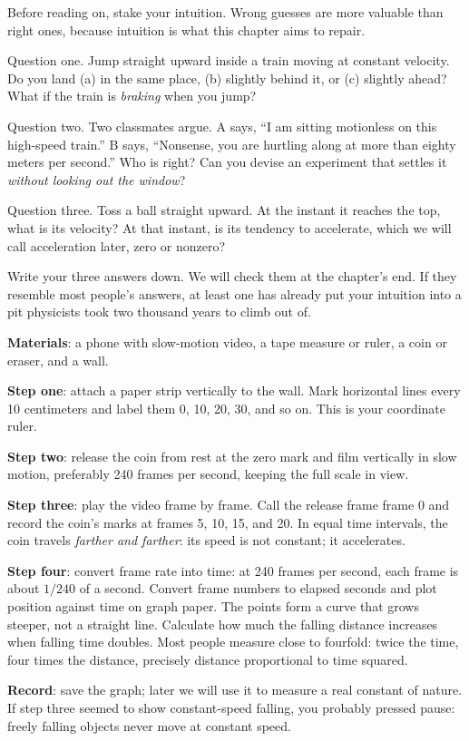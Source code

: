 
Before reading on, stake your intuition. Wrong guesses are more valuable than right ones, because intuition is what this chapter aims to repair.

Question one. Jump straight upward inside a train moving at constant velocity. Do you land (a) in the same place, (b) slightly behind it, or (c) slightly ahead? What if the train is \emph{braking} when you jump?

Question two. Two classmates argue. A says, ``I am sitting motionless on this high-speed train.'' B says, ``Nonsense, you are hurtling along at more than eighty meters per second.'' Who is right? Can you devise an experiment that settles it \emph{without looking out the window}?

Question three. Toss a ball straight upward. At the instant it reaches the top, what is its velocity? At that instant, is its tendency to accelerate, which we will call acceleration later, zero or nonzero?

Write your three answers down. We will check them at the chapter's end. If they resemble most people's answers, at least one has already put your intuition into a pit physicists took two thousand years to climb out of.


\begin{experiment}
\textbf{Materials}: a phone with slow-motion video, a tape measure or ruler, a coin or eraser, and a wall.

\textbf{Step one}: attach a paper strip vertically to the wall. Mark horizontal lines every 10 centimeters and label them 0, 10, 20, 30, and so on. This is your coordinate ruler.

\textbf{Step two}: release the coin from rest at the zero mark and film vertically in slow motion, preferably 240 frames per second, keeping the full scale in view.

\textbf{Step three}: play the video frame by frame. Call the release frame frame 0 and record the coin's marks at frames 5, 10, 15, and 20. In equal time intervals, the coin travels \emph{farther and farther}: its speed is not constant; it accelerates.

\textbf{Step four}: convert frame rate into time: at 240 frames per second, each frame is about \(1/240\) of a second. Convert frame numbers to elapsed seconds and plot position against time on graph paper. The points form a curve that grows steeper, not a straight line. Calculate how much the falling distance increases when falling time doubles. Most people measure close to fourfold: twice the time, four times the distance, precisely distance proportional to time squared.

\textbf{Record}: save the graph; later we will use it to measure a real constant of nature. If step three seemed to show constant-speed falling, you probably pressed pause: freely falling objects never move at constant speed.
\end{experiment}

